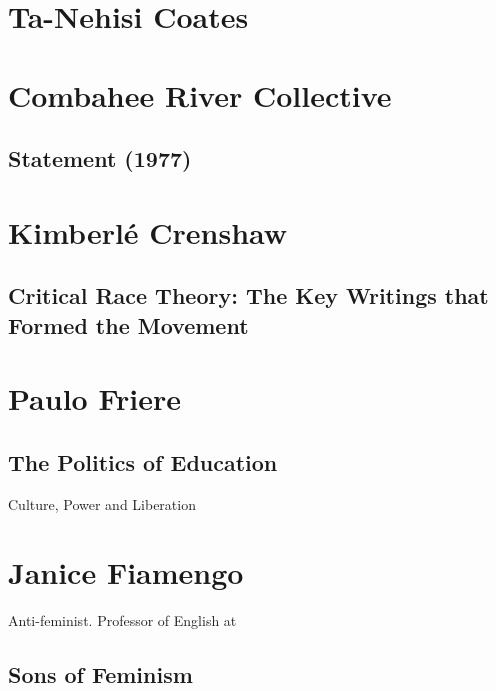 \documentclass[10pt,titlepage]{book}
\begin{document}
\section{Ta-Nehisi Coates}\label{CoatesTa-Nehisi}

\subsection{\cite{coatestnh-bwm,coatestnh-wweyip}}

\section{Combahee River Collective}\label{Combahee}

\subsection{Statement (1977) \cite{combahee-statement}}

\section{Kimberlé Crenshaw}\label{CrenshawKimberle}

\subsection{Critical Race Theory: The Key Writings that Formed the Movement \cite{crenshaw1995critical}}

\section{Paulo Friere}\label{FrierePaulo}

\subsection{The Politics of Education \cite{friere-poled}}

Culture, Power and Liberation

\section{Janice Fiamengo}\label{FiamengoJanice}

Anti-feminist.
Professor of English at

\subsection{Sons of Feminism \cite{fiamengo2018sons}}
\end{document}
